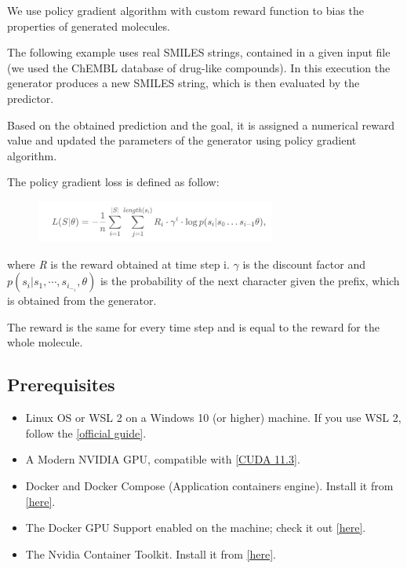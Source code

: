 \documentclass[a4paper]{article}
\begin{document}
We use policy gradient algorithm with custom reward function to bias the properties of generated molecules.


The following example uses real SMILES strings, contained in a given input file (we used the ChEMBL database of drug-like compounds).
In this execution the generator produces a new SMILES string, which is then evaluated by the predictor. 


Based on the obtained prediction and the goal, it is assigned a numerical reward value and updated the parameters of the generator using policy gradient algorithm.
 
The policy gradient loss is defined as follow:

\begin{figure}[htbp]
    \centering
        \includegraphics[width=0.70\textwidth]{formula.png}
    \label{fig:formula}
\end{figure}

where \textit{R} is the reward obtained at time step i. \begin{math}\gamma\end{math} is the discount factor and \begin{math} p(s_i | s_1,\cdots ,s_i_-_1,\theta) \end{math} is the probability of the next character given the prefix, which is obtained from the generator. 


The reward is the same for every time step and is equal to the reward for the whole molecule. 

\subsection{Prerequisites}\label{sec:Prerequisites}

\begin{itemize}
	\item Linux OS or WSL 2 on a Windows 10 (or higher) machine. If you use WSL 2, follow the \href{https://docs.nvidia.com/cuda/wsl-user-guide/index.html#getting-started-with-cuda-on-wsl}{[official guide]}.
	\item A Modern NVIDIA GPU, compatible with \href{https://developer.nvidia.com/cuda-11.3.0-download-archive}{[CUDA 11.3]}.
	\item Docker and Docker Compose (Application containers engine). Install it from \href{https://www.docker.com}{[here]}.
	\item The Docker GPU Support enabled on the machine; check it out \href{https://docs.docker.com/compose/gpu-support/}{[here]}.
	\item The Nvidia Container Toolkit. Install it from \href{https://docs.nvidia.com/datacenter/cloud-native/container-toolkit/install-guide.html#install-guide}{[here]}.
\end{itemize}
\end{document}
